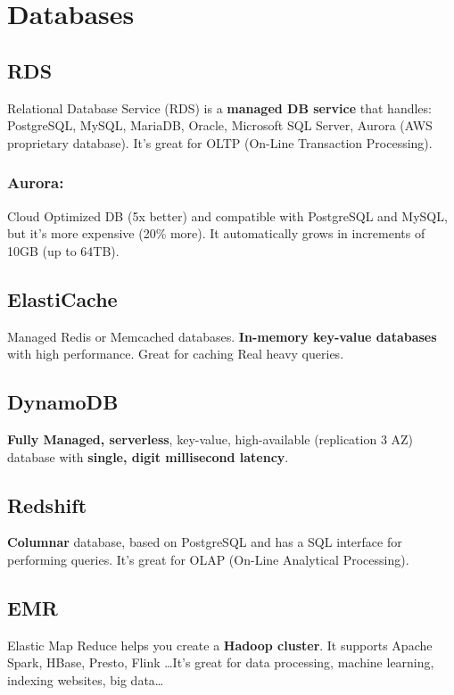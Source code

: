\section{Databases}\label{sec:databases}

\subsection{RDS}\label{subsec:rds}
Relational Database Service (RDS) is a \textbf{managed DB service} that handles: PostgreSQL, MySQL, MariaDB, Oracle, Microsoft SQL Server, Aurora (AWS proprietary database).
It's great for OLTP (On-Line Transaction Processing).

\subsubsection{Aurora:}
Cloud Optimized DB (5x better) and compatible with PostgreSQL and MySQL, but it's more expensive (20\% more).
It automatically grows in increments of 10GB (up to 64TB).

\subsection{ElastiCache}\label{subsec:elasticache}
Managed Redis or Memcached databases. \textbf{In-memory key-value databases} with high performance.
Great for  caching Real heavy queries.

\subsection{DynamoDB}\label{subsec:dynamodb}
\textbf{Fully Managed, serverless}, key-value, high-available (replication 3 AZ) database with \textbf{single, digit millisecond latency}\@.

\subsection{Redshift}\label{subsec:redshift}
\textbf{Columnar} database, based on PostgreSQL and has a SQL interface for performing queries.
It's great for  OLAP (On-Line Analytical Processing).

\subsection{EMR}\label{subsec:emr}
Elastic Map Reduce helps you create a \textbf{Hadoop cluster}\@.
It supports Apache Spark, HBase, Presto, Flink \ldots It's great for data processing, machine learning, indexing websites, big data\ldots

